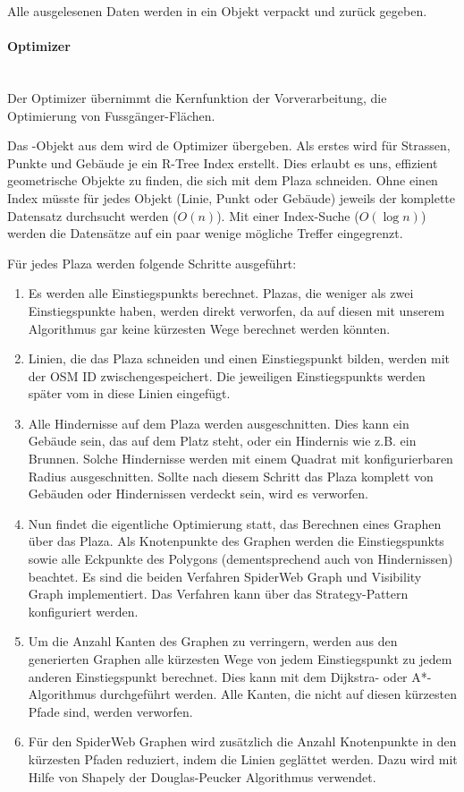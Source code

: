 Alle ausgelesenen Daten werden in ein  Objekt verpackt und zurück gegeben.

\paragraph{Optimizer}\label{impl:Optimizer}~\\
Der Optimizer übernimmt die Kernfunktion der Vorverarbeitung, die Optimierung von Fussgänger-Flächen.

Das -Objekt aus dem  wird de Optimizer übergeben. Als erstes wird für Strassen, Punkte und Gebäude je ein R-Tree \cite{rtree_Guttman} Index erstellt. Dies erlaubt es uns, effizient geometrische Objekte zu finden, die sich mit dem Plaza schneiden. Ohne einen Index müsste für jedes Objekt (Linie, Punkt oder Gebäude) jeweils der komplette Datensatz durchsucht werden ($O(n)$). Mit einer Index-Suche ($O(\log n)$) werden die Datensätze auf ein paar wenige mögliche Treffer eingegrenzt.

Für jedes Plaza werden folgende Schritte ausgeführt:
\begin{enumerate}
    \item Es werden alle \glspl{Einstiegspunkt} berechnet. Plazas, die weniger als zwei Einstiegspunkte haben, werden direkt verworfen, da auf diesen mit unserem Algorithmus gar keine kürzesten Wege berechnet werden könnten.
    \item Linien, die das Plaza schneiden und einen \gls{Einstiegspunkt} bilden, werden mit der \ac{OSM} ID zwischengespeichert. Die jeweiligen \glspl{Einstiegspunkt} werden später vom  in diese Linien eingefügt.
    \item Alle Hindernisse auf dem Plaza werden ausgeschnitten. Dies kann ein Gebäude sein, das auf dem Platz steht, oder ein Hindernis wie z.B. ein Brunnen. Solche Hindernisse werden mit einem Quadrat mit konfigurierbaren Radius ausgeschnitten. Sollte nach diesem Schritt das Plaza komplett von Gebäuden oder Hindernissen verdeckt sein, wird es verworfen.
    \item Nun findet die eigentliche Optimierung statt, das Berechnen eines Graphen über das Plaza. Als Knotenpunkte des Graphen werden die \glspl{Einstiegspunkt} sowie alle Eckpunkte des Polygons (dementsprechend auch von Hindernissen) beachtet. Es sind die beiden Verfahren SpiderWeb Graph und Visibility Graph implementiert. Das Verfahren kann über das Strategy-Pattern \cite{gof_patterns} konfiguriert werden.
    \item Um die Anzahl Kanten des Graphen zu verringern, werden aus den generierten Graphen alle kürzesten Wege von jedem Einstiegspunkt zu jedem anderen Einstiegspunkt berechnet. Dies kann mit dem Dijkstra- \cite{dijkstra_algorithm} oder A*-Algorithmus \cite{astar} durchgeführt werden. Alle Kanten, die nicht auf diesen kürzesten Pfade sind, werden verworfen.
    \item Für den SpiderWeb Graphen wird zusätzlich die Anzahl Knotenpunkte in den kürzesten Pfaden reduziert, indem die Linien geglättet werden. Dazu wird mit Hilfe von Shapely \cite{shapely} der Douglas-Peucker Algorithmus \cite{douglas-peucker_algorithm} verwendet.
\end{enumerate}


